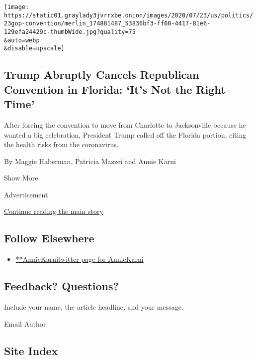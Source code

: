 \begin{enumerate}
  \texttt{[image: https://static01.graylady3jvrrxbe.onion/images/2020/07/23/us/politics/23gop-convention/merlin\_174881487\_53836bf3-ff60-4417-81e6-129efa24429c-thumbWide.jpg?quality=75\\\&auto=webp\\\&disable=upscale]}

  \hypertarget{trump-abruptly-cancels-republican-convention-in-florida-its-not-the-right-time}{%
  \subsection{Trump Abruptly Cancels Republican Convention in Florida:
  `It's Not the Right
  Time'}\label{trump-abruptly-cancels-republican-convention-in-florida-its-not-the-right-time}}

  After forcing the convention to move from Charlotte to Jacksonville
  because he wanted a big celebration, President Trump called off the
  Florida portion, citing the health risks from the coronavirus.

  By Maggie Haberman, Patricia Mazzei and Annie Karni
\end{enumerate}

Show More

Advertisement

\protect\hyperlink{after-mid2}{Continue reading the main story}

\hypertarget{follow-elsewhere}{%
\subsection{Follow Elsewhere}\label{follow-elsewhere}}

\begin{itemize}
\tightlist
\item
  \href{https://twitter.com/AnnieKarni}{**AnnieKarnitwitter page for
  AnnieKarni}
\end{itemize}

\hypertarget{feedback-questions}{%
\subsection{Feedback? Questions?}\label{feedback-questions}}

Include your name, the article headline, and your message.

Email Author

\hypertarget{site-index}{%
\subsection{Site Index}\label{site-index}}

